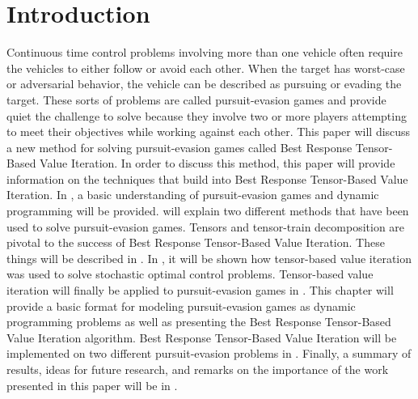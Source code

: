 \chapter{Introduction}\label{chp:intro} 
Continuous time control problems involving more than one vehicle often require the vehicles to either follow or avoid each other. When the target has worst-case or adversarial behavior, the vehicle can be described as pursuing or evading the target. These sorts of problems are called pursuit-evasion games and provide quiet the challenge to solve because they involve two or more players attempting to meet their objectives while working against each other. This paper will discuss a new method for solving pursuit-evasion games called Best Response Tensor-Based Value Iteration. In order to discuss this method, this paper will provide information on the techniques that build into Best Response Tensor-Based Value Iteration. In , a basic understanding of pursuit-evasion games and dynamic programming will be provided.  will explain two different methods that have been used to solve pursuit-evasion games. Tensors and tensor-train decomposition are pivotal to the success of Best Response Tensor-Based Value Iteration. These things will be described in . In , it will be shown how tensor-based value iteration was used to solve stochastic optimal control problems. Tensor-based value iteration will finally be applied to pursuit-evasion games in . This chapter will provide a basic format for modeling pursuit-evasion games as dynamic programming problems as well as presenting the Best Response Tensor-Based Value Iteration algorithm. Best Response Tensor-Based Value Iteration will be implemented on two different pursuit-evasion problems in . Finally, a summary of results, ideas for future research, and remarks on the importance of the work presented in this paper will be in .    

